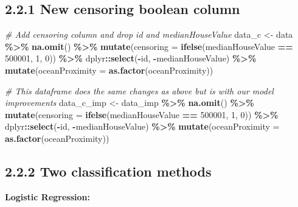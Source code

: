 \documentclass[
]{article}
\newenvironment{Shaded}{\begin{snugshade}}{\end{snugshade}}
\newcommand{\AttributeTok}[1]{\textcolor[rgb]{0.13,0.29,0.53}{#1}}
\newcommand{\CommentTok}[1]{\textcolor[rgb]{0.56,0.35,0.01}{\textit{#1}}}
\newcommand{\DecValTok}[1]{\textcolor[rgb]{0.00,0.00,0.81}{#1}}
\newcommand{\FunctionTok}[1]{\textcolor[rgb]{0.13,0.29,0.53}{\textbf{#1}}}
\newcommand{\NormalTok}[1]{#1}
\newcommand{\OtherTok}[1]{\textcolor[rgb]{0.56,0.35,0.01}{#1}}
\newcommand{\SpecialCharTok}[1]{\textcolor[rgb]{0.81,0.36,0.00}{\textbf{#1}}}
\begin{document}
\subsection{2.2.1 New censoring boolean
column}\label{new-censoring-boolean-column}

\begin{Shaded}
\begin{Highlighting}[]
\CommentTok{\# Add censoring column and drop id and medianHouseValue}
\NormalTok{data\_c }\OtherTok{\textless{}{-}}\NormalTok{ data }\SpecialCharTok{\%\textgreater{}\%}
  \FunctionTok{na.omit}\NormalTok{() }\SpecialCharTok{\%\textgreater{}\%}
  \FunctionTok{mutate}\NormalTok{(}\AttributeTok{censoring =} \FunctionTok{ifelse}\NormalTok{(medianHouseValue }\SpecialCharTok{==} \DecValTok{500001}\NormalTok{, }\DecValTok{1}\NormalTok{, }\DecValTok{0}\NormalTok{)) }\SpecialCharTok{\%\textgreater{}\%}
\NormalTok{  dplyr}\SpecialCharTok{::}\FunctionTok{select}\NormalTok{(}\SpecialCharTok{{-}}\NormalTok{id, }\SpecialCharTok{{-}}\NormalTok{medianHouseValue) }\SpecialCharTok{\%\textgreater{}\%}
  \FunctionTok{mutate}\NormalTok{(}\AttributeTok{oceanProximity =} \FunctionTok{as.factor}\NormalTok{(oceanProximity))}



\CommentTok{\# This dataframe does the same changes as above but is with our model improvements}
\NormalTok{data\_c\_imp }\OtherTok{\textless{}{-}}\NormalTok{ data\_imp }\SpecialCharTok{\%\textgreater{}\%}
  \FunctionTok{na.omit}\NormalTok{() }\SpecialCharTok{\%\textgreater{}\%}
  \FunctionTok{mutate}\NormalTok{(}\AttributeTok{censoring =} \FunctionTok{ifelse}\NormalTok{(medianHouseValue }\SpecialCharTok{==} \DecValTok{500001}\NormalTok{, }\DecValTok{1}\NormalTok{, }\DecValTok{0}\NormalTok{)) }\SpecialCharTok{\%\textgreater{}\%}
\NormalTok{  dplyr}\SpecialCharTok{::}\FunctionTok{select}\NormalTok{(}\SpecialCharTok{{-}}\NormalTok{id, }\SpecialCharTok{{-}}\NormalTok{medianHouseValue) }\SpecialCharTok{\%\textgreater{}\%}
  \FunctionTok{mutate}\NormalTok{(}\AttributeTok{oceanProximity =} \FunctionTok{as.factor}\NormalTok{(oceanProximity))}
\end{Highlighting}
\end{Shaded}

\subsection{2.2.2 Two classification
methods}\label{two-classification-methods}

\noindent \large \textbf{Logistic Regression:} \normalsize
\end{document}
